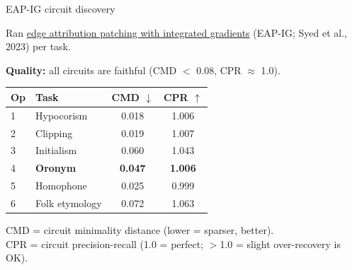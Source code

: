 \documentclass[10pt,aspectratio=169]{beamer}
\begin{document}
\begin{frame}{EAP-IG circuit discovery}
\hypertarget{sl:eapresults}{}

\small
Ran \href{https://arxiv.org/abs/2310.10348}{edge attribution patching with integrated gradients} (EAP-IG; Syed et al., 2023) per task.

\vspace{0.3em}
\textbf{Quality:} all circuits are faithful (CMD $<$ 0.08, CPR $\approx$ 1.0).

\vspace{0.5em}
\begin{center}
\renewcommand{\arraystretch}{1.15}
\begin{tabular}{llcc}
\toprule
\textbf{Op} & \textbf{Task} & \textbf{CMD $\downarrow$} & \textbf{CPR $\uparrow$} \\
\midrule
1 & Hypocorism & 0.018 & 1.006 \\
2 & Clipping & 0.019 & 1.007 \\
3 & Initialism & 0.060 & 1.043 \\
\rowcolor{fusion!8}
4 & \textbf{Oronym} & \textbf{0.047} & \textbf{1.006} \\
5 & Homophone & 0.025 & 0.999 \\
6 & Folk etymology & 0.072 & 1.063 \\
\bottomrule
\end{tabular}
\end{center}

\vspace{0.5em}
{\footnotesize CMD = circuit minimality distance (lower = sparser, better).\\
CPR = circuit precision-recall (1.0 = perfect; $>$1.0 = slight over-recovery is OK).}
\end{frame}
\end{document}
